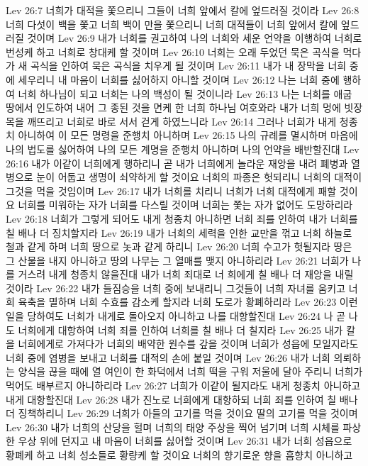 Lev 26:7  너희가 대적을 쫓으리니 그들이 너희 앞에서 칼에 엎드러질 것이라
Lev 26:8  너희 다섯이 백을 쫓고 너희 백이 만을 쫓으리니 너희 대적들이 너희 앞에서 칼에 엎드러질 것이며
Lev 26:9  내가 너희를 권고하여 나의 너희와 세운 언약을 이행하여 너희로 번성케 하고 너희로 창대케 할 것이며
Lev 26:10  너희는 오래 두었던 묵은 곡식을 먹다가 새 곡식을 인하여 묵은 곡식을 치우게 될 것이며
Lev 26:11  내가 내 장막을 너희 중에 세우리니 내 마음이 너희를 싫어하지 아니할 것이며
Lev 26:12  나는 너희 중에 행하여 너희 하나님이 되고 너희는 나의 백성이 될 것이니라
Lev 26:13  나는 너희를 애굽 땅에서 인도하여 내어 그 종된 것을 면케 한 너희 하나님 여호와라 내가 너희 멍에 빗장목을 깨뜨리고 너희로 바로 서서 걷게 하였느니라
Lev 26:14  그러나 너희가 내게 청종치 아니하여 이 모든 명령을 준행치 아니하며
Lev 26:15  나의 규례를 멸시하며 마음에 나의 법도를 싫어하여 나의 모든 계명을 준행치 아니하며 나의 언약을 배반할진대
Lev 26:16  내가 이같이 너희에게 행하리니 곧 내가 너희에게 놀라운 재앙을 내려 폐병과 열병으로 눈이 어둡고 생명이 쇠약하게 할 것이요 너희의 파종은 헛되리니 너희의 대적이 그것을 먹을 것임이며
Lev 26:17  내가 너희를 치리니 너희가 너희 대적에게 패할 것이요 너희를 미워하는 자가 너희를 다스릴 것이며 너희는 쫓는 자가 없어도 도망하리라
Lev 26:18  너희가 그렇게 되어도 내게 청종치 아니하면 너희 죄를 인하여 내가 너희를 칠 배나 더 징치할지라
Lev 26:19  내가 너희의 세력을 인한 교만을 꺾고 너희 하늘로 철과 같게 하며 너희 땅으로 놋과 같게 하리니
Lev 26:20  너희 수고가 헛될지라 땅은 그 산물을 내지 아니하고 땅의 나무는 그 열매를 맺지 아니하리라
Lev 26:21  너희가 나를 거스려 내게 청종치 않을진대 내가 너희 죄대로 너 희에게 칠 배나 더 재앙을 내릴 것이라
Lev 26:22  내가 들짐승을 너희 중에 보내리니 그것들이 너희 자녀를 움키고 너희 육축을 멸하며 너희 수효를 감소케 할지라 너희 도로가 황폐하리라
Lev 26:23  이런 일을 당하여도 너희가 내게로 돌아오지 아니하고 나를 대항할진대
Lev 26:24  나 곧 나도 너희에게 대항하여 너희 죄를 인하여 너희를 칠 배나 더 칠지라
Lev 26:25  내가 칼을 너희에게로 가져다가 너희의 배약한 원수를 갚을 것이며 너희가 성읍에 모일지라도 너희 중에 염병을 보내고 너희를 대적의 손에 붙일 것이며
Lev 26:26  내가 너희 의뢰하는 양식을 끊을 때에 열 여인이 한 화덕에서 너희 떡을 구워 저울에 달아 주리니 너희가 먹어도 배부르지 아니하리라
Lev 26:27  너희가 이같이 될지라도 내게 청종치 아니하고 내게 대항할진대
Lev 26:28  내가 진노로 너희에게 대항하되 너희 죄를 인하여 칠 배나 더 징책하리니
Lev 26:29  너희가 아들의 고기를 먹을 것이요 딸의 고기를 먹을 것이며
Lev 26:30  내가 너희의 산당을 헐며 너희의 태양 주상을 찍어 넘기며 너희 시체를 파상한 우상 위에 던지고 내 마음이 너희를 싫어할 것이며
Lev 26:31  내가 너희 성읍으로 황폐케 하고 너희 성소들로 황량케 할 것이요 너희의 향기로운 향을 흠향치 아니하고
